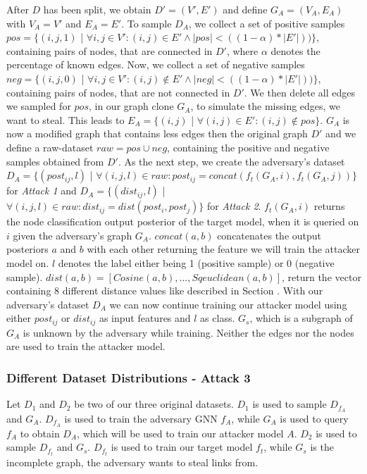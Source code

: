         After $D$ has been split, we obtain $D' = (V', E')$ and define $G_A = (V_A, E_A)$ with $V_A = V'$ and $E_A = E'$.
        To sample $D_A$, we collect a set of positive samples $pos = \{(i,j, 1)$ | $\forall i,j \in V': (i,j) \in E' \wedge |pos| < ((1 - \alpha) * |E'|))\}$, containing pairs of nodes, that are connected in $D'$, where $\alpha$ denotes the percentage of known edges.
        Now, we collect a set of negative samples $neg = \{(i,j, 0)$ | $\forall i,j \in V': (i,j) \not\in E' \wedge |neg| < ((1 - \alpha) * |E'|))\}$, containing pairs of nodes, that are not connected in $D'$.
        We then delete all edges we sampled for $pos$, in our graph clone $G_A$, to simulate the missing edges, we want to steal.
        This leads to $E_A = \{(i,j)$ | $\forall (i,j) \in E': (i,j) \not\in pos\}$.
        $G_A$ is now a modified graph that contains less edges then the original graph $D'$ and we define a raw-dataset $raw = pos \cup neg$, containing the positive and negative samples obtained from $D'$.
        As the next step, we create the adversary's dataset $D_A = \{(post_{ij}, l)$ | $\forall (i,j,l)\in raw: post_{ij} = concat(f_t(G_A, i), f_t(G_A, j))\}$ for \emph{Attack 1} and $D_A = \{(dist_{ij}, l)$ | $\forall (i,j,l)\in raw: dist_{ij} = dist(post_i, post_j)\}$ for \emph{Attack 2}.
        $f_t(G_A, i)$ returns the node classification output posterior of the target model, when it is queried on $i$ given the adversary's graph $G_A$.
        $concat(a, b)$ concatenates the output posteriors $a$ and $b$ with each other returning the feature we will train the attacker model on.
        $l$ denotes the label either being 1 (positive sample) or 0 (negative sample).
        $dist(a,b) = [Cosine(a,b), ..., Sqeuclidean(a,b)]$, return the vector containing 8 different distance values like described in Section .
        With our adversary's dataset $D_A$ we can now continue training our attacker model using either $post_{ij}$ or $dist_{ij}$ as input features and $l$ as class.
        $G_s$, which is a subgraph of $G_A$ is unknown by the adversary while training. Neither the edges nor the nodes are used to train the attacker model.

      \subsubsection*{Different Dataset Distributions - Attack 3}
        Let $D_1$ and $D_2$ be two of our three original datasets.
        $D_1$ is used to sample $D_{f_A}$ and $G_A$.
        $D_{f_A}$ is used to train the adversary GNN $f_A$, while $G_A$ is used to query $f_A$ to obtain $D_A$, which will be used to train our attacker model $A$.
        $D_2$ is used to sample $D_{f_t}$ and $G_s$.
        $D_{f_t}$ is used to train our target model $f_t$, while $G_s$ is the incomplete graph, the adversary wants to steal links from.

